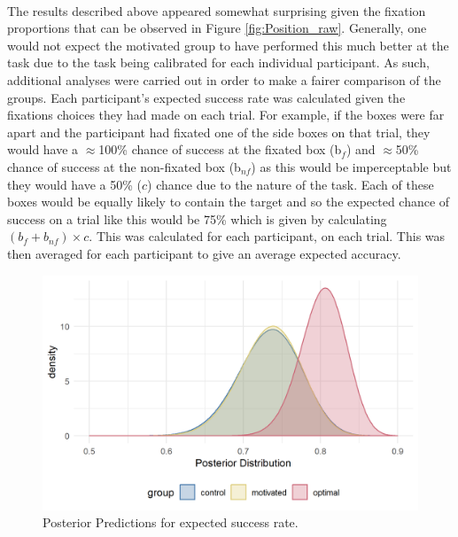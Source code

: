 \documentclass[12pt]{article}
\begin{document}
\paragraph{} The results described above appeared somewhat surprising given the fixation proportions that can be observed in Figure \ref{fig:Position_raw}. Generally, one would not expect the motivated group to have performed this much better at the task due to the task being calibrated for each individual participant. As such, additional analyses were carried out in order to make a fairer comparison of the groups. Each participant's expected success rate was calculated given the fixations choices they had made on each trial. For example, if the boxes were far apart and the participant had fixated one of the side boxes on that trial, they would have a $\approx$100\% chance of success at the fixated box (b$_f$) and $\approx$50\% chance of success at the non-fixated box (b$_{nf}$) as this would be imperceptable but they would have a 50\% ($c$) chance due to the nature of the task. Each of these boxes would be equally likely to contain the target and so the expected chance of success on a trial like this would be 75\% which is given by calculating $(b_f + b_{nf})\times c$. This was calculated for each participant, on each trial. This was then averaged for each participant to give an average expected accuracy. 

\begin{figure}[ht!]
	\includegraphics[scale=1]{../Figures/Model_stan_expacc.png}
	\centering
	\captionsetup{justification=centering}
	\caption{Posterior Predictions for expected success rate.}
	\label{fig:Model_exp_acc}
\end{figure}
\end{document}
